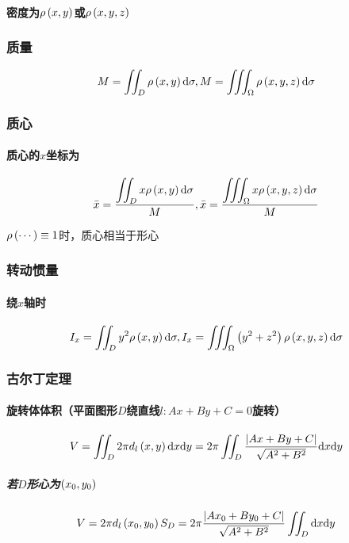 \documentclass{article}
\begin{document}
\paragraph{密度为$\rho\left(x,y\right)$或$\rho\left(x,y,z\right)$}

\subsubsection{质量}

\[M=\iint_D\rho\left(x,y\right)\mathrm d\sigma,
    M=\iiint_\Omega\rho\left(x,y,z\right)\mathrm d\sigma\]

\subsubsection{质心}

\paragraph{质心的$x$坐标为}

\[\bar x=\frac{\displaystyle\iint_Dx\rho\left(x,y\right)\mathrm d\sigma}M,
    \bar x=\frac{\displaystyle\iiint_\Omega x\rho\left(x,y,z\right)\mathrm d\sigma}M\]

$\rho\left(\cdots\right)\equiv1$时，质心相当于形心

\subsubsection{转动惯量}

\paragraph{绕$x$轴时}

\[I_x=\iint_Dy^2\rho\left(x,y\right)\mathrm d\sigma,
    I_x=\iiint_\Omega\left(y^2+z^2\right)\rho\left(x,y,z\right)\mathrm d\sigma\]

\subsubsection{古尔丁定理}

\paragraph{旋转体体积（平面图形$D$绕直线$l:Ax+By+C=0$旋转）}

\[V=\iint_D2\pi d_l\left(x,y\right)\mathrm d x\mathrm d y=2\pi\iint_D\frac{\left|Ax+By+C\right|}{\sqrt{A^2+B^2}}\mathrm d x\mathrm d y\]

\subparagraph{若$D$形心为$\left(x_0,y_0\right)$}

\[V=2\pi d_l\left(x_0,y_0\right)S_D=2\pi\frac{\left|Ax_0+By_0+C\right|}{\sqrt{A^2+B^2}}\iint_D\mathrm d x\mathrm d y\]
\end{document}
